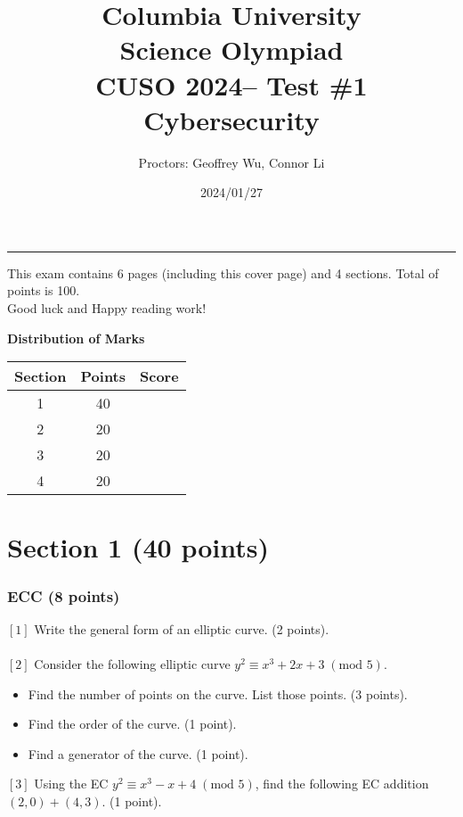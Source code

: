 \documentclass[letterpaper,12pt,addpoints]{exam}
\newcommand{\university}{Columbia University}
\newcommand{\faculty}{Science Olympiad}
\newcommand{\class}{CUSO 2024}
\newcommand{\examnum}{Test \#1}
\newcommand{\content}{Cybersecurity}
\newcommand{\examdate}{2024/01/27}
\begin{document}
\title{\Large \textbf{\university\\ \faculty\\
\bigskip
\class -- \examnum \\ \content}}
\author{Proctors: Geoffrey Wu, Connor Li}
\date{\examdate}
\maketitle
\begin{flushleft}
\medskip
{}
\end{flushleft}
\noindent \rule{\textwidth}{1pt}

\noindent This exam contains 6 pages (including this cover page) and 4 sections. Total of points is 100.\\
Good luck and Happy reading work!

\begin{center}
\textbf{Distribution of Marks}\\
\end{center}
\begin{center}
\begin{tabular} {| c | c | c |}
    \hline
    Section & Points & Score \\
    \hline
    1 & 40 & \\
    \hline
    2 & 20 & \\
    \hline
    3 & 20 & \\
    \hline
    4 & 20 & \\
    \hline
\end{tabular}
\end{center}
\clearpage

\section*{Section 1 (40 points)}
\subsubsection*{ECC (8 points)}
$[1]$ Write the general form of an elliptic curve. (2 points).\\
\\
$[2]$ Consider the following elliptic curve $y^2 \equiv x^3 + 2x + 3\;(\text{mod } 5)$. 
\begin{itemize}
    \item Find the number of points on the curve. List those points. (3 points).
    \item Find the order of the curve. (1 point).
    \item Find a generator of the curve. (1 point).
\end{itemize}
$[3]$ Using the EC $y^2 \equiv x^3 - x + 4 \;(\text{mod } 5)$, find the following EC addition $(2,0) + (4,3)$. (1 point).
\end{document}
